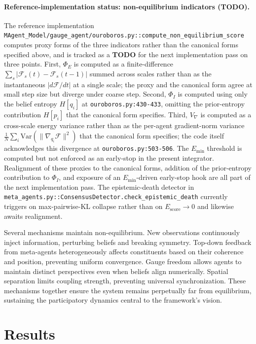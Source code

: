 \documentclass[11pt]{article}
\begin{document}
\paragraph{Reference-implementation status: non-equilibrium indicators (\textbf{TODO}).}
The reference implementation \texttt{MAgent\_Model/gauge\_agent/ouroboros.py::compute\_non\_equilibrium\_score} computes proxy forms of the three indicators rather than the canonical forms specified above, and is tracked as a \textbf{TODO} for the next implementation pass on three points. First, $\Phi_E$ is computed as a finite-difference $\sum_s |\mathcal{F}_s(t) - \mathcal{F}_s(t{-}1)|$ summed across scales rather than as the instantaneous $|d\mathcal{F}/dt|$ at a single scale; the proxy and the canonical form agree at small step size but diverge under coarse step. Second, $\Phi_I$ is computed using only the belief entropy $H[q_i]$ at \texttt{ouroboros.py:430-433}, omitting the prior-entropy contribution $H[p_i]$ that the canonical form specifies. Third, $V_{\nabla}$ is computed as a cross-scale energy variance rather than as the per-agent gradient-norm variance $\frac{1}{N}\sum_i \mathrm{Var}(\|\nabla_{q_i}\mathcal{F}\|^2)$ that the canonical form specifies; the code itself acknowledges this divergence at \texttt{ouroboros.py:503-506}. The $E_{\min}$ threshold is computed but not enforced as an early-stop in the present integrator. Realignment of these proxies to the canonical forms, addition of the prior-entropy contribution to $\Phi_I$, and exposure of an $E_{\min}$-driven early-stop hook are all part of the next implementation pass. The epistemic-death detector in \texttt{meta\_agents.py::ConsensusDetector.check\_epistemic\_death} currently triggers on max-pairwise-KL collapse rather than on $E_{\mathrm{score}} \to 0$ and likewise awaits realignment.

Several mechanisms maintain non-equilibrium. New observations continuously inject information, perturbing beliefs and breaking symmetry. Top-down feedback from meta-agents heterogeneously affects constituents based on their coherence and position, preventing uniform convergence. Gauge freedom allows agents to maintain distinct perspectives even when beliefs align numerically. Spatial separation limits coupling strength, preventing universal synchronization. These mechanisms together ensure the system remains perpetually far from equilibrium, sustaining the participatory dynamics central to the framework's vision.

\section{Results}
\label{sec:results}
\end{document}
